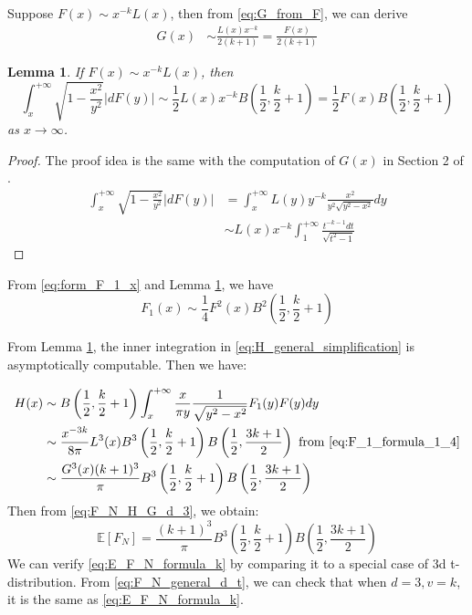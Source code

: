 \documentclass{article}
\newtheorem{lemma}{Lemma}
\def\E{\mathbb{E}}
\begin{document}
Suppose $F(x) \sim x^{-k} L(x)$, then from
\eqref{eq:G_from_F},
we can derive
\begin{align}
    G(x) & \sim \frac{L(x)x^{-k}}{2(k+1)} 
    = \frac{F(x)}{2(k+1)}
\end{align}
\begin{lemma}\label{lem:F_x_sqrt_11}
    If $F(x) \sim x^{-k} L(x)$, then
    \begin{equation}
        \int_x^{+\infty} \sqrt{1-\frac{x^2}{y^2}}
        |d F(y)| \sim \frac{1}{2} L(x) x^{-k} B\left(\frac{1}{2}, \frac{k}{2}+1
        \right)
        = \frac{1}{2} F(x) B\left(\frac{1}{2}, \frac{k}{2}+1
        \right)
    \end{equation}
    as $x\to \infty$.
\end{lemma}
\begin{proof}
    The proof idea is the same with the computation
    of $G(x)$ in Section 2 of \cite{carnal1970konvexe}.
\begin{align*}
    \int_x^{+\infty} \sqrt{1-\frac{x^2}{y^2}}
        |d F(y)| &=\int_x^{+\infty} L(y)y^{-k} \frac{x^2}{y^2\sqrt{y^2-x^2}} dy \\
&\sim L(x)x^{-k}\int_1^{+\infty} \frac{t^{-k-1}dt}{\sqrt{t^2-1}}
\end{align*}
\end{proof}
From \eqref{eq:form_F_1_x} and Lemma \ref{lem:F_x_sqrt_11}, we have
\begin{equation}\label{eq:F_1_formula_1_4}
    F_1(x) \sim \frac{1}{4} F^2(x) B^2\left(\frac{1}{2}, \frac{k}{2}+1
    \right)
\end{equation}



From Lemma \ref{lem:F_x_sqrt_11},
the inner integration in \eqref{eq:H_general_simplification} is asymptotically
computable. Then we have:

\begin{align}
    H(x)
    &\sim  B\left(\frac{1}{2},
    \frac{k}{2}+1\right)\int_x^{+\infty}
    \frac{x}{\pi y}\frac{1}{\sqrt{y^2-x^2}}
    F_1(y) F(y) dy\\
&\sim \frac{x^{-3k}}{8\pi} L^3(x)
B^3\left(\frac{1}{2}, \frac{k}{2}+1
\right) B\left(\frac{1}{2}, \frac{3k+1}{2}\right)
\textrm{ from } \eqref{eq:F_1_formula_1_4} \notag\\
& \sim\frac{G^3(x) (k+1)^3}{\pi}
B^3\left(\frac{1}{2}, \frac{k}{2}+1
\right) B\left(\frac{1}{2}, \frac{3k+1}{2}\right)
\end{align}
Then from \eqref{eq:F_N_H_G_d_3}, we obtain:
\begin{equation}\label{eq:E_F_N_formula_k}
    \E[F_N] = \frac{(k+1)^3}{\pi}B^3\left(\frac{1}{2}, \frac{k}{2}+1
    \right) B\left(\frac{1}{2}, \frac{3k+1}{2}\right)    
\end{equation}
We can verify \eqref{eq:E_F_N_formula_k} by comparing it to
a special case of 3d t-distribution. From
\eqref{eq:F_N_general_d_t}, we can check that when $d=3,v=k$,
it is the same as \eqref{eq:E_F_N_formula_k}.
\end{document}
